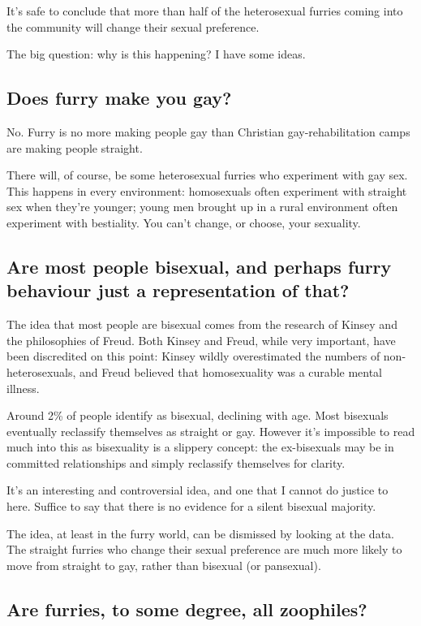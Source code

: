 It’s safe to conclude that more than half of the heterosexual furries coming into the community will change their sexual preference.

The big question: why is this happening? I have some ideas.

\subsection*{Does furry make you gay?}

No. Furry is no more making people gay than Christian gay-rehabilitation camps are making people straight.

There will, of course, be some heterosexual furries who experiment with gay sex. This happens in every environment: homosexuals often experiment with straight sex when they’re younger; young men brought up in a rural environment often experiment with bestiality. You can’t change, or choose, your sexuality.

\subsection*{Are most people bisexual, and perhaps furry behaviour just a representation of that?}

The idea that most people are bisexual comes from the research of Kinsey and the philosophies of Freud. Both Kinsey and Freud, while very important, have been discredited on this point: Kinsey wildly overestimated the numbers of non-heterosexuals, and Freud believed that homosexuality was a curable mental illness.

Around 2\% of people identify as bisexual, declining with age. Most bisexuals eventually reclassify themselves as straight or gay. However it’s impossible to read much into this as bisexuality is a slippery concept: the ex-bisexuals may be in committed relationships and simply reclassify themselves for clarity.

It’s an interesting and controversial idea, and one that I cannot do justice to here. Suffice to say that there is no evidence for a silent bisexual majority.

The idea, at least in the furry world, can be dismissed by looking at the data. The straight furries who change their sexual preference are much more likely to move from straight to gay, rather than bisexual (or pansexual).

\subsection*{Are furries, to some degree, all zoophiles?}


